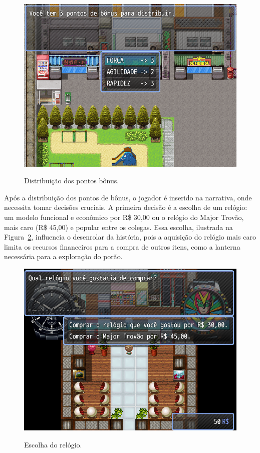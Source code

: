 \begin{figure}[!htbp]
	\centering
	\caption{Distribuição dos pontos bônus.}
	\includegraphics[scale=0.55]{Textuais/Pictures/Distribui-bonus.png}
	\label{fig:distribui-bonus}
\end{figure}

Após a distribuição dos pontos de bônus, o jogador é inserido na narrativa, onde necessita tomar decisões cruciais. A primeira decisão é a escolha de um relógio: um modelo funcional e econômico por R\$ 30,00 ou o relógio do Major Trovão, mais caro (R\$ 45,00) e popular entre os colegas. Essa escolha, ilustrada na Figura~\ref{fig:escolha-relogio}, influencia o desenrolar da história, pois a aquisição do relógio mais caro limita os recursos financeiros para a compra de outros itens, como a lanterna necessária para a exploração do porão.

\begin{figure}[!htbp]
	\centering
	\caption{Escolha do relógio.}
	\includegraphics[scale=0.5]{Textuais/Pictures/escolha-relogio.png}
	\label{fig:escolha-relogio}
\end{figure}

